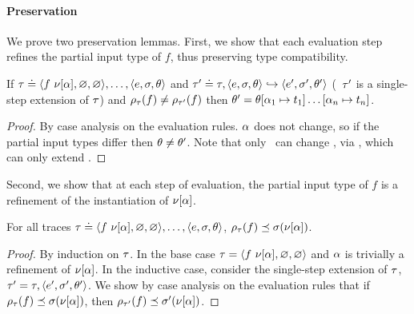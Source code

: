 
\paragraph{Preservation}
%
We prove two preservation lemmas. First, we show that each evaluation
step refines the partial input type of $f$, thus preserving type
compatibility.
%
\begin{lem}
\label{lem:vsu-ext}
If  $\tau \doteq \langle f\ \nu[\alpha], \varnothing, \varnothing \rangle,\ldots,\langle e, \sigma, \theta \rangle$
and $\tau' \doteq \tau, \langle e, \sigma, \theta \rangle \hookrightarrow \langle e', \sigma', \theta' \rangle$
  (\ie\ $\tau'$ is a single-step extension of $\tau$)
and $\rho_{\tau}(f) \neq \rho_{\tau'}(f)$
then $\theta' = \theta[\alpha_1 \mapsto t_1] \ldots [\alpha_n \mapsto t_n]$.
\end{lem}
\begin{proof}
  By case analysis on the evaluation rules.
  $\alpha$ does not change, so if the partial input types differ then
  $\theta \neq \theta'$.
  Note that only \forcesym\ can change \tsu,
  via \unifysym, which can only extend \tsu.
\end{proof}
%
Second, we show that at each step of evaluation, the partial input type of $f$
is a refinement of the instantiation of $\nu[\alpha]$.
%
\begin{lem}
\label{lem:resolve-compat}
For all traces
$\tau \doteq \langle f\ \nu[\alpha], \varnothing, \varnothing \rangle,\ldots,\langle e, \sigma, \theta \rangle$,
${\rho_{\tau}(f)} \preceq {\ensuremath{\sigma(\nu[\alpha])}}$.
\end{lem}
\begin{proof}
  By induction on $\tau$.
  In the base case $\tau = \langle f\ \nu[\alpha], \varnothing, \varnothing \rangle$
  and $\alpha$ is trivially a refinement of $\nu[\alpha]$.
  In the inductive case, consider the single-step extension of $\tau$,
  $\tau' = \tau,\langle e', \sigma', \theta' \rangle$.
  We show by case analysis on the evaluation rules that if
  ${\rho_{\tau}(f)} \preceq {\ensuremath{\sigma(\nu[\alpha])}}$, then
  ${\rho_{\tau'}(f)} \preceq {\ensuremath{\sigma'(\nu[\alpha])}}$.
\end{proof}

